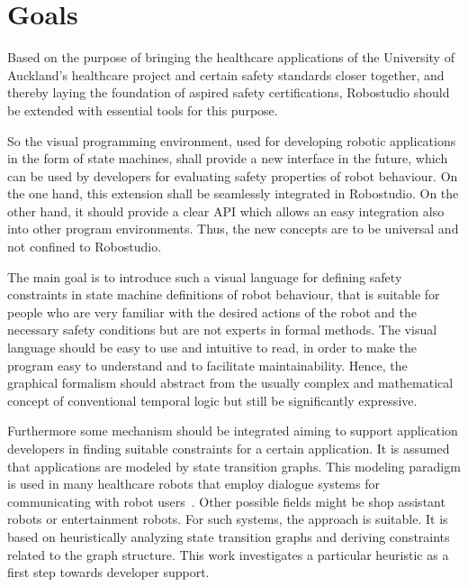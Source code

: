 \chapter{Goals}
\label{chap:goals}


Based on the purpose of bringing the healthcare applications of the University of Auckland's healthcare project and certain safety standards closer together, and the\-re\-by laying the foundation of aspired safety certifications, Robostudio should be extended with essential tools for this purpose.

So the visual programming environment, used for developing robotic applications in the form of state machines, shall provide a new interface in the future, which can be used by developers for evaluating safety properties of robot behaviour. On the one hand, this extension shall be seamlessly integrated in Robostudio. On the other hand, it should provide a clear API which allows an easy integration also into other program environments. Thus, the new concepts are to be universal and not confined to Robostudio.

The main goal is to introduce such a visual language for defining safety constraints in state machine definitions of robot behaviour, that is suitable for people who are very familiar with the desired actions of the robot and the necessary safety conditions but are not experts in formal methods. The visual language should be easy to use and intuitive to read, in order to make the program easy to understand and to facilitate maintainability.
Hence, the graphical formalism should abstract from the usually complex and mathematical concept of conventional temporal logic but still be significantly expressive.
 
Furthermore some mechanism should be integrated aiming to support application developers in finding suitable constraints for a certain application. It is assumed that applications are modeled by state transition graphs. This modeling paradigm is used in many healthcare robots that employ dialogue systems for communicating with robot users~\cite{Bickmore2006}. Other possible fields might be shop assistant robots or entertainment robots. For such systems, the approach is suitable. It is based on heuristically analyzing state transition graphs and deriving constraints related to the graph structure. This work investigates a particular heuristic as a first step towards developer support. 

